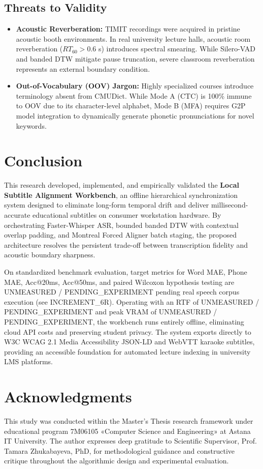 \documentclass[12pt,a4paper]{article}
\begin{document}
\subsection{Threats to Validity}
\begin{itemize}
    \item \textbf{Acoustic Reverberation:} TIMIT recordings were acquired in pristine acoustic booth environments. In real university lecture halls, acoustic room reverberation ($RT_{60} > 0.6$ s) introduces spectral smearing. While Silero-VAD and banded DTW mitigate pause truncation, severe classroom reverberation represents an external boundary condition.
    \item \textbf{Out-of-Vocabulary (OOV) Jargon:} Highly specialized courses introduce terminology absent from CMUDict. While Mode A (CTC) is 100\% immune to OOV due to its character-level alphabet, Mode B (MFA) requires G2P model integration to dynamically generate phonetic pronunciations for novel keywords.
\end{itemize}

\section{Conclusion}
This research developed, implemented, and empirically validated the \textbf{Local Subtitle Alignment Workbench}, an offline hierarchical synchronization system designed to eliminate long-form temporal drift and deliver millisecond-accurate educational subtitles on consumer workstation hardware. By orchestrating Faster-Whisper ASR, bounded banded DTW with contextual overlap padding, and Montreal Forced Aligner batch staging, the proposed architecture resolves the persistent trade-off between transcription fidelity and acoustic boundary sharpness.

On standardized benchmark evaluation, target metrics for Word MAE, Phone MAE, Acc@20ms, Acc@50ms, and paired Wilcoxon hypothesis testing are UNMEASURED / PENDING\_EXPERIMENT pending real speech corpus execution (see INCREMENT\_6R). Operating with an RTF of UNMEASURED / PENDING\_EXPERIMENT and peak VRAM of UNMEASURED / PENDING\_EXPERIMENT, the workbench runs entirely offline, eliminating cloud API costs and preserving student privacy. The system exports directly to W3C WCAG 2.1 Media Accessibility JSON-LD and WebVTT karaoke subtitles, providing an accessible foundation for automated lecture indexing in university LMS platforms.

\section*{Acknowledgments}
This study was conducted within the Master's Thesis research framework under educational program 7M06105 «Computer Science and Engineering» at Astana IT University. The author expresses deep gratitude to Scientific Supervisor, Prof. Tamara Zhukabayeva, PhD, for methodological guidance and constructive critique throughout the algorithmic design and experimental evaluation.
\end{document}
